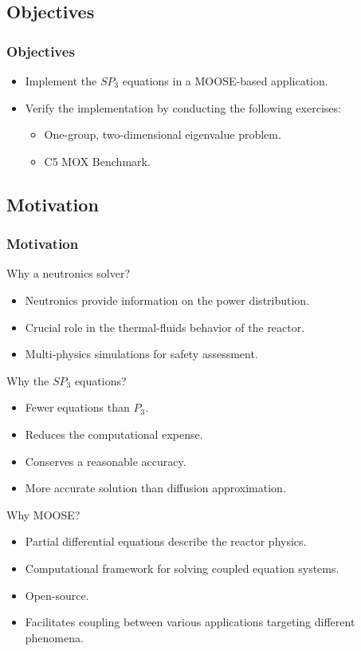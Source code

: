 \subsection{Objectives}

\begin{frame}
\frametitle{Objectives}
  \begin{itemize}
    \item Implement the $SP_3$ equations in a MOOSE-based application.
    \item Verify the implementation by conducting the following exercises:
      \begin{itemize}
        \item One-group, two-dimensional eigenvalue problem.
        \item C5 MOX Benchmark.
  	  \end{itemize}
  \end{itemize}
\end{frame}


\subsection{Motivation}

\begin{frame}
\frametitle{Motivation}
  
  Why a neutronics solver?
  \begin{itemize}
    \item Neutronics provide information on the power distribution.
    \item Crucial role in the thermal-fluids behavior of the reactor.
    \item Multi-physics simulations for safety assessment.
  \end{itemize}

  Why the $SP_3$ equations?
  \begin{itemize}
    \item Fewer equations than $P_3$.
    \item Reduces the computational expense.
    \item Conserves a reasonable accuracy.
    \item More accurate solution than diffusion approximation.
  \end{itemize}
  
  Why MOOSE?
  \begin{itemize}
    \item Partial differential equations describe the reactor physics.
    \item Computational framework for solving coupled equation systems.
    \item Open-source.
    \item Facilitates coupling between various applications targeting different phenomena.
  \end{itemize}

\end{frame}
